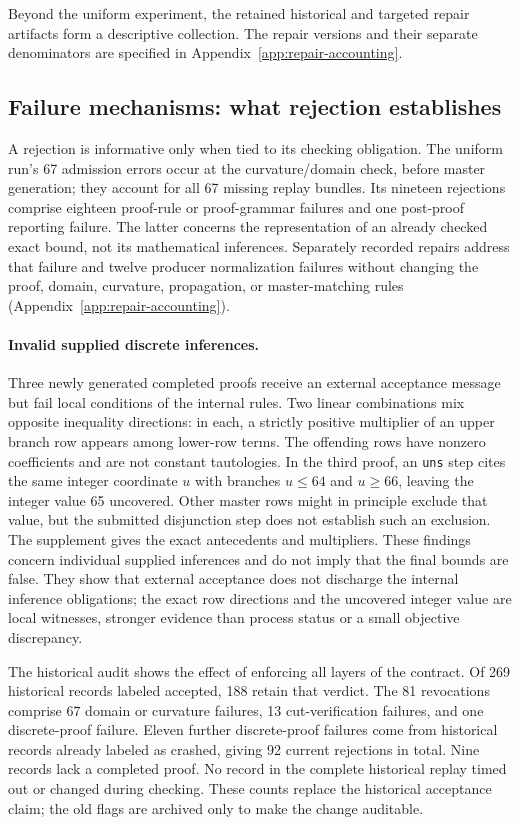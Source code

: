 Beyond the uniform experiment, the retained historical and targeted repair
artifacts form a descriptive collection. The repair versions and their
separate denominators are specified in Appendix~\ref{app:repair-accounting}.


\subsection{Failure mechanisms: what rejection establishes}
\label{sec:failure-mechanisms}

A rejection is informative only when tied to its checking obligation. The
uniform run's 67 admission errors occur at the curvature/domain check, before
master generation; they account for all 67 missing replay bundles. Its nineteen
rejections comprise eighteen proof-rule or proof-grammar failures and one
post-proof reporting failure. The latter concerns the representation of an
already checked exact bound, not its mathematical inferences. Separately
recorded repairs address that failure and twelve producer normalization
failures without changing the proof, domain, curvature, propagation, or
master-matching rules (Appendix~\ref{app:repair-accounting}).

\paragraph{Invalid supplied discrete inferences.}
Three newly generated completed proofs receive an external acceptance message
but fail local conditions of the internal rules. Two linear combinations mix
opposite inequality directions: in each, a strictly positive multiplier of an
upper branch row appears among lower-row terms. The offending rows have nonzero
coefficients and are not constant tautologies. In the third proof, an
\texttt{uns} step cites the same integer coordinate $u$ with branches
$u\le64$ and $u\ge66$, leaving the integer value 65 uncovered. Other master rows
might in principle exclude that value, but the submitted disjunction step does
not establish such an exclusion. The supplement gives the exact antecedents and
multipliers. These findings concern individual supplied inferences and do not
imply that the final bounds are false. They show that external acceptance does
not discharge the internal inference obligations; the exact row directions and
the uncovered integer value are local witnesses, stronger evidence than process
status or a small objective discrepancy.

The historical audit shows the effect of enforcing all layers of the contract.
Of 269 historical records labeled accepted, 188 retain that verdict. The 81
revocations comprise 67 domain or curvature failures, 13 cut-verification
failures, and one discrete-proof failure. Eleven further discrete-proof
failures come from historical records already labeled as crashed, giving 92
current rejections in total. Nine records lack a completed proof. No record in
the complete historical replay timed out or changed during checking.
These counts replace the historical acceptance claim; the old flags are
archived only to make the change auditable.


